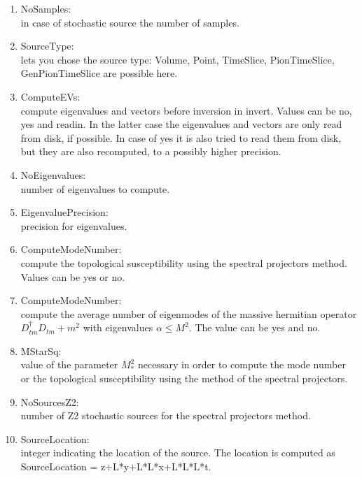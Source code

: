 \begin{enumerate}
\item {\ttfamily NoSamples}:\\
  in case of stochastic source the number of samples.

\item {\ttfamily SourceType}:\\
  lets you chose the source type: {\ttfamily Volume, Point, TimeSlice,
  PionTimeSlice, GenPionTimeSlice}
  are possible here.

\item {\ttfamily ComputeEVs}:\\
  compute eigenvalues and vectors before inversion in invert. Values
  can be no, yes and readin. In the latter case the eigenvalues and
  vectors are only read from disk, if possible. In case of yes it is
  also tried to read them from disk, but they are also recomputed, to
  a possibly higher precision.

\item {\ttfamily NoEigenvalues}:\\
  number of eigenvalues to compute.

\item {\ttfamily EigenvaluePrecision}:\\
  precision for eigenvalues.

\item {\ttfamily ComputeModeNumber}:\\
  compute the topological susceptibility using the spectral projectors
  method. Values can be yes or no.

\item {\ttfamily ComputeModeNumber}:\\
  compute the average number of eigenmodes of the massive hermitian
  operator $D_{tm}^{\dagger}D_{tm}+m^2$ with eigenvalues
  $\alpha\leq M^2$. The value can be
  yes and no.

\item {\ttfamily MStarSq}:\\
  value of the parameter $M_*^2$ necessary in order to compute the
  mode number or the topological susceptibility using the method of
  the spectral projectors.

\item {\ttfamily NoSourcesZ2}:\\
  number of Z2 stochastic sources for the spectral projectors method.

\item {\ttfamily SourceLocation}:\\
  integer indicating the location of the source. The location is computed as
  {\ttfamily SourceLocation = z+L*y+L*L*x+L*L*L*t}.


\end{enumerate}

